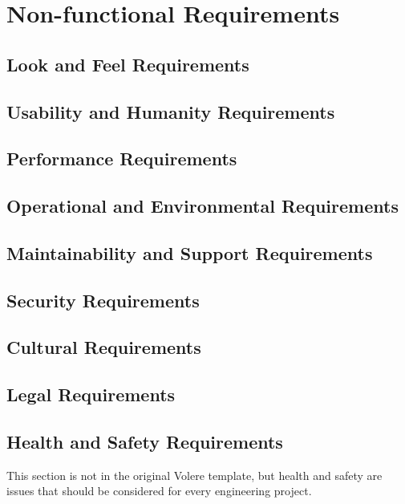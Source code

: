 \documentclass[12pt]{article}
\begin{document}
\section{Non-functional Requirements}

\subsection{Look and Feel Requirements}

\subsection{Usability and Humanity Requirements}

\subsection{Performance Requirements}

\subsection{Operational and Environmental Requirements}

\subsection{Maintainability and Support Requirements}

\subsection{Security Requirements}

\subsection{Cultural Requirements}

\subsection{Legal Requirements}

\subsection{Health and Safety Requirements}

This section is not in the original Volere template, but health and safety are issues that should
be considered for every engineering project.
\end{document}
